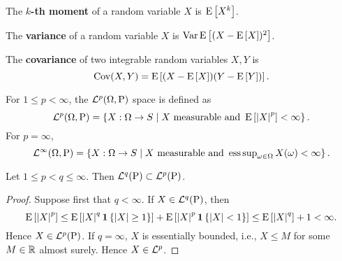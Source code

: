 \begin{definition}
    The \textbf{$k$-th moment} of a random variable $X$ is $\E\sbrc{X^k}$. 
\end{definition}

\begin{definition}
    The \textbf{variance} of a random variable $X$ is $\Var\E\sbrc{(X - \E\sbrc{X})^2}$.
\end{definition}

\begin{definition}
    The \textbf{covariance} of two integrable random variables $X,Y$ is 
    \begin{equation*}
        \Cov(X,Y) = \E\sbrc{(X - \E\sbrc{X})(Y - \E\sbrc{Y})}. 
    \end{equation*}
\end{definition}

\begin{definition}
    For $1\leq p <\infty$, the $\L^p(\Omega,\P)$ space is defined as 
    \begin{equation*}
        \L^p(\Omega,\P) = \Set{X:\Omega\to S}{X\text{ measurable and }\E\sbrc{\abs{X}^p}<\infty}. 
    \end{equation*}
    For $p = \infty$, 
    \begin{equation*}
        \L^\infty(\Omega, \P) = \Set{X:\Omega\to S}{X\text{ measurable and }\esssup_{\omega\in\Omega} X(\omega) < \infty}. 
    \end{equation*} 
\end{definition}

\begin{proposition}\label{prop:embedding}
    Let $1\leq p<q\leq\infty$. Then $\L^q(\P)\subset\L^p(\P)$. 
\end{proposition}
\begin{proof}
    Suppose first that $q < \infty$. If $X\in\L^q(\P)$, then 
    \begin{equation*}
        \E\sbrc{\abs{X}^p} \leq \E\sbrc{\abs{X}^q\one\set{\abs{X}\geq 1}} 
        + \E\sbrc{\abs{X}^p\one\set{\abs{X}< 1}}\leq \E\sbrc{\abs{X}^q} + 1<\infty. 
    \end{equation*}
    Hence $X\in\L^p(\P)$. If $q = \infty$, $X$ is essentially bounded, i.e., 
    $X\leq M$ for some $M\in\R$ almost surely. Hence $X\in\L^p$. 
\end{proof}